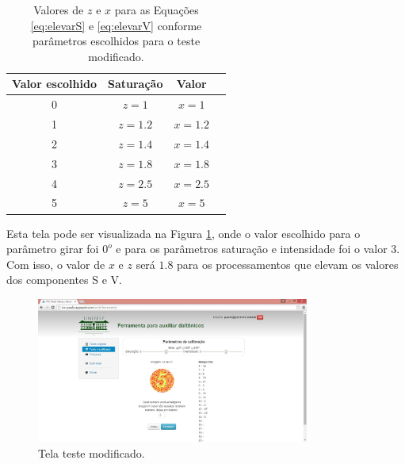 \documentclass[	12pt, Times, openright, twoside, a4paper, english, brazil]{abntex2}
\begin{document}
\begin{table}[ht]
\centering
\begin{tabular}{cccc}
\hline      
\textbf{Valor escolhido} & \textbf{Saturação} & \textbf{Valor}     \\ \hline
0                        & $z = 1$            &  $x = 1$                          \\ \hline
1                        & $z = 1.2$          &  $x = 1.2$                          \\ \hline
2                        & $z = 1.4$          &  $x = 1.4$                          \\ \hline 
3                        & $z = 1.8$          &  $x = 1.8$                          \\ \hline
4                        & $z = 2.5$          &  $x = 2.5$                            \\ \hline
5                        & $z = 5$            &  $x = 5$                           \\ \hline


\end{tabular}
\caption{Valores de $z$ e $x$ para as Equações \ref{eq:elevarS} e \ref{eq:elevarV} conforme parâmetros escolhidos para o teste modificado.}
\label{tab:parametrosCalibracao}
\end{table}

Esta tela pode ser visualizada na Figura \ref{fig:telaTesteModificado}, onde o valor escolhido para o parâmetro girar foi $0^o$ e para os parâmetros saturação e intensidade foi o valor $3$. Com isso, o valor de $x$ e $z$ será $1.8$ para os processamentos que elevam os valores dos componentes S e V.

\begin{figure}[!htb]
\centering \includegraphics[width=0.8\textwidth]{telaTesteModificado.jpg}
\caption{Tela teste modificado.} \label{fig:telaTesteModificado}
\end{figure}
\end{document}
